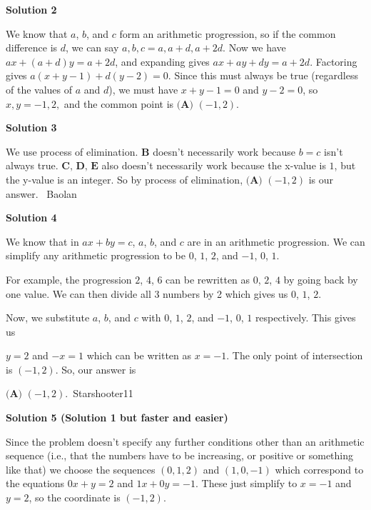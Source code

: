 \begin{enumerate}
 



\textbf{Solution 2}

We know that $a$, $b$, and $c$ form an arithmetic progression, so if the common difference is $d$, we can say $a,b,c = a, a+d, a+2d.$ Now we have $ax+ (a+d)y = a+2d$, and expanding gives $ax + ay + dy = a + 2d.$ Factoring gives $a(x+y-1)+d(y-2) = 0$. Since this must always be true (regardless of the values of $a$ and $d$), we must have $x+y-1 = 0$ and $y-2 = 0$, so $x,y = -1, 2,$ and the common point is $\boxed{\textbf{(A) } (-1,2)}$.

 



\textbf{Solution 3}

We use process of elimination. $\textbf{B}$ doesn't necessarily work because $b = c$ isn't always true.  $\textbf{C, D, E}$ also doesn't necessarily work because the x-value is $1$, but the y-value is an integer. So by process of elimination, $\boxed{\textbf{(A) } (-1, 2)}$ is our answer.    ~Baolan

 



\textbf{Solution 4}

We know that in $ax + by = c$, $a$, $b$, and $c$ are in an arithmetic progression. We can simplify any arithmetic progression to be $0$, $1$, $2$, and $-1$, $0$, $1$.

 For example, the progression $2$, $4$, $6$ can be rewritten as $0$, $2$, $4$ by going back by one value. We can then divide all 3 numbers by 2 which gives us $0$, $1$, $2$.

 Now, we substitute $a$, $b$, and $c$ with $0$, $1$, $2$, and $-1$, $0$, $1$ respectively. This gives us

 $y = 2$ and $-x = 1$ which can be written as $x = -1$. The only point of intersection is $(-1,2)$. So, our answer is

 $\boxed{\textbf{(A) } (-1, 2)}$.~Starshooter11

 



\textbf{Solution 5 (Solution 1 but faster and easier)}

Since the problem doesn't specify any further conditions other than an arithmetic sequence (i.e., that the numbers have to be increasing, or positive or something like that) we choose the sequences $(0, 1, 2)$ and $(1, 0, -1)$ which correspond to the equations $0x+y=2$ and $1x+0y=-1$. These just simplify to $x=-1$ and $y=2$, so the coordinate is $(-1, 2)$.


\end{enumerate}
